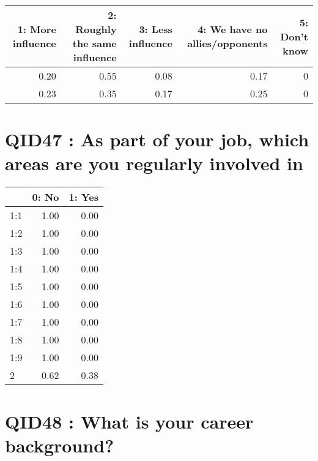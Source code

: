 \documentclass[]{article}
\begin{document}
\begin{table}[H]
\centering\begingroup\fontsize{30}{32}\selectfont

\begin{tabular}{r|r|r|r|r}
\hline
1: More influence &  2: Roughly the same influence &  3: Less influence &  4: We have no allies/opponents &  5: Don't know\\
\hline
0.20 & 0.55 & 0.08 & 0.17 & 0\\
\hline
0.23 & 0.35 & 0.17 & 0.25 & 0\\
\hline
\end{tabular}
\endgroup{}
\end{table}

\section{QID47 : As part of your job, which areas are you regularly
involved
in}\label{qid47-as-part-of-your-job-which-areas-are-you-regularly-involved-in}

\begin{table}[H]
\centering\begingroup\fontsize{30}{32}\selectfont

\begin{tabular}{l|r|r}
\hline
  & 0: No &  1: Yes\\
\hline
1:1 & 1.00 & 0.00\\
\hline
1:2 & 1.00 & 0.00\\
\hline
1:3 & 1.00 & 0.00\\
\hline
1:4 & 1.00 & 0.00\\
\hline
1:5 & 1.00 & 0.00\\
\hline
1:6 & 1.00 & 0.00\\
\hline
1:7 & 1.00 & 0.00\\
\hline
1:8 & 1.00 & 0.00\\
\hline
1:9 & 1.00 & 0.00\\
\hline
2 & 0.62 & 0.38\\
\hline
\end{tabular}
\endgroup{}
\end{table}

\section{QID48 : What is your career
background?}\label{qid48-what-is-your-career-background}
\end{document}
